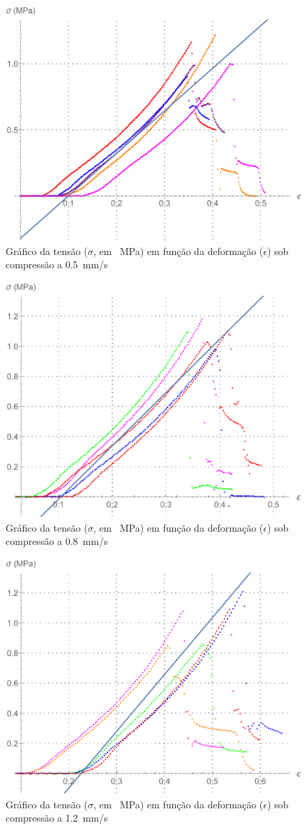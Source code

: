 \documentclass[a4paper, 12pt]{article}
\begin{document}
	\begin{figure}[h!]
		\centering
		\includegraphics[width=0.7\linewidth]{sections/images/g1}
		\caption{Gráfico da tensão ($\sigma$, em \SI{}{\mega\pascal}) em função da deformação ($\epsilon$) sob compressão a \SI{.5}{\milli\meter/\second}}
		\label{fig:g1}
	\end{figure}
	
	\begin{figure}[h!]
		\centering
		\includegraphics[width=0.7\linewidth]{sections/images/g2}
		\caption{Gráfico da tensão ($\sigma$, em \SI{}{\mega\pascal}) em função da deformação ($\epsilon$) sob compressão a \SI{.8}{\milli\meter/\second}}
		\label{fig:g2}
	\end{figure}

	\begin{figure}[h!]
		\centering
		\includegraphics[width=0.7\linewidth]{sections/images/g3}
		\caption{Gráfico da tensão ($\sigma$, em \SI{}{\mega\pascal}) em função da deformação ($\epsilon$) sob compressão a \SI{1.2}{\milli\meter/\second}}
		\label{fig:g3}
	\end{figure}
\end{document}
